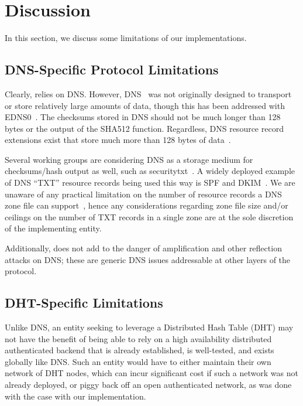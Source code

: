 \section{Discussion} \label{sec:discussion}

In this section, we discuss some limitations of our implementations.

\subsection{DNS-Specific Protocol Limitations}

Clearly, \DNSSYS{} relies on DNS. However, DNS~\cite{DNS1} was not originally
designed to transport or store relatively large amounts of data, though this has
been addressed with EDNS0~\cite{EDNS}. The checksums stored in DNS should not be
much longer than 128 bytes or the output of the SHA512 function. Regardless, DNS
resource record extensions exist that store much more than 128 bytes of
data~\cite{CERT, IPSECKEY, DANE3, DANE1}.

Several working groups are considering DNS as a storage medium for
checksums/hash output as well, such as securitytxt~\cite{draft-sectxt}. A widely
deployed example of DNS ``TXT'' resource records being used this way is SPF and
DKIM~\cite{DKIM}. We are unaware of any practical limitation on the number of
resource records a DNS zone file can support~\cite{DNS1}, hence any
considerations regarding zone file size and/or ceilings on the number of TXT
records in a single zone are at the sole discretion of the implementing entity.

Additionally, \DNSSYS{} does not add to the danger of amplification and other
reflection attacks on DNS; these are generic DNS issues addressable at other
layers of the protocol.


\subsection{DHT-Specific Limitations}

Unlike DNS, an entity seeking to leverage a Distributed Hash Table (DHT) may not
have the benefit of being able to rely on a high availability distributed
authenticated backend that is already established, is well-tested, and exists
globally like DNS. Such an entity would have to either maintain their own
network of DHT nodes, which can incur significant cost if such a network was not
already deployed, or piggy back off an open authenticated network, as was done
with the case with our \DHTSYS{} implementation.

